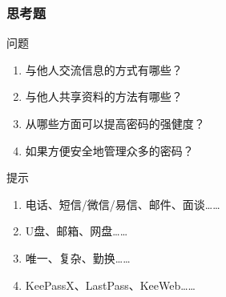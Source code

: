 \begin{frame}
  \frametitle{思考题}
  \begin{block}{问题}
  \begin{enumerate}[<+->]
    \item 与他人交流信息的方式有哪些？
    \item 与他人共享资料的方法有哪些？
    \item 从哪些方面可以提高密码的强健度？
    \item 如果方便安全地管理众多的密码？
  \end{enumerate}
  \end{block}
  \pause
  \begin{block}{提示}
    \begin{enumerate}
      \item 电话、短信/微信/易信、邮件、面谈……
      \item U盘、邮箱、网盘……
      \item 唯一、复杂、勤换……
      \item KeePassX、LastPass、KeeWeb……
    \end{enumerate}
  \end{block}
\end{frame}




